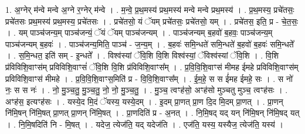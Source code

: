 \documentclass[17pt]{extarticle}
\begin{document}
1. अ॒ग्नेर् म॑न्वे मन्वे अ॒ग्ने र॒ग्नेर् म॑न्वे । . म॒न्वे॒ प्र॒थ॒मस्य॑ प्रथ॒मस्य॑ मन्वे मन्वे प्रथ॒मस्य॑ । . प्र॒थ॒मस्य॒ प्रचे॑तसः॒ प्रचे॑तसः प्रथ॒मस्य॑ प्रथ॒मस्य॒ प्रचे॑तसः । . प्रचे॑तसो॒ यं ॅयम् प्रचे॑तसः॒ प्रचे॑तसो॒ यम् । . प्रचे॑तस॒ इति॒ प्र - चे॒त॒सः॒ । . यम् पाञ्च॑जन्य॒म् पाञ्च॑जन्यं॒ ॅयं ॅयम् पाञ्च॑जन्यम् । . पाञ्च॑जन्यम् ब॒हवो॑ ब॒हवः॒ पाञ्च॑जन्य॒म् पाञ्च॑जन्यम् ब॒हवः॑ । . पाञ्च॑जन्य॒मिति॒ पाञ्च॑ - ज॒न्य॒म् । . ब॒हवः॑ समि॒न्धते॑ समि॒न्धते॑ ब॒हवो॑ ब॒हवः॑ समि॒न्धते᳚ । . स॒मि॒न्धत॒ इति॑ सम् - इ॒न्धते᳚ । . विश्व॑स्यां ॅवि॒शि वि॒शि विश्व॑स्यां॒ ॅविश्व॑स्यां ॅवि॒शि । . वि॒शि प्र॑विविशि॒वाꣳस॑म् प्रविविशि॒वाꣳसं॑ ॅवि॒शि वि॒शि प्र॑विविशि॒वाꣳस᳚म् । . प्र॒वि॒वि॒शि॒वाꣳस॑ मीमह ईमहे प्रविविशि॒वाꣳस॑म् प्रविविशि॒वाꣳस॑ मीमहे । . प्र॒वि॒वि॒शि॒वाꣳस॒मिति॑ प्र - वि॒वि॒शि॒वाꣳस᳚म् । . ई॒म॒हे॒ स स ई॑मह ईमहे॒ सः । . स नो॑ नः॒ स स नः॑ । . नो॒ मु॒ञ्च॒तु॒ मु॒ञ्च॒तु॒ नो॒ नो॒ मु॒ञ्च॒तु॒ । . मु॒ञ्च॒ त्वꣳह॑सो॒ अꣳह॑सो मुञ्चतु मुञ्च॒ त्वꣳह॑सः । . अꣳह॑स॒ इत्यꣳह॑सः । . यस्ये॒द मि॒दं ॅयस्य॒ यस्ये॒दम् । . इ॒दम् प्रा॒णत् प्रा॒ण दि॒द मि॒दम् प्रा॒णत् । . प्रा॒णन् नि॑मि॒षन् नि॑मि॒षत् प्रा॒णत् प्रा॒णन् नि॑मि॒षत् । . प्रा॒णदिति॑ प्र - अ॒नत् । . नि॒मि॒षद् यद् यन् नि॑मि॒षन् नि॑मि॒षद् यत् । . नि॒मि॒षदिति॑ नि - मि॒षत् । . यदेज॒ त्येज॑ति॒ यद् यदेज॑ति । . एज॑ति॒ यस्य॒ यस्यैज॒ त्येज॑ति॒ यस्य॑ । \newline
\end{document}
